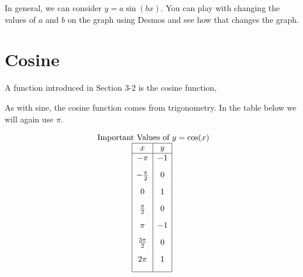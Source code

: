 \documentclass[nooutcomes]{ximera}
\begin{document}
In general, we can consider $y=a\sin(bx)$.  You can play with changing the values of $a$ and $b$ on the graph using Desmos and see how that changes the graph.  

\begin{center}  
\end{center}



\newpage


\section{Cosine}
A function introduced in Section 3-2 is the cosine function, 

\begin{center}
\end{center}


As with sine, the cosine function comes from trigonometry. In the table below we will again use $\pi$.

\begin{center}
\end{center}

\[
\begin{array}{ c }
 \text{ Important Values of  $y=\cos(x)$}\\
\begin{array}{|c|c|}
 \hline
 x & y\\
 \hline
 -\pi&-1\\[2ex]
 -\frac{\pi}{2}&0\\[2ex]
 0&1\\[2ex]
 \frac{\pi}{2}&0\\[2ex]
 \pi&-1\\[2ex]
\frac{3\pi}{2}&0\\[2ex]
 2 \pi&1\\[2ex]
\hline
\end{array}
\end{array}
\]
\end{document}
